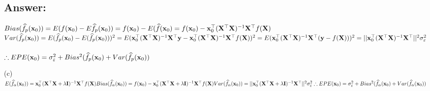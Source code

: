 \documentclass[a4 paper]{article}
\renewcommand{\epsilon}{\varepsilon}
\newcounter{problem}[section]
\newenvironment{solution}{\newpage\setcounter{problem}{0}\begin{framed}\section*{Answer:}}{\vspace{15pt}\end{framed}}
\begin{document}
\begin{solution}
$Bias(\widehat{f_p}(\mathbf x_0)) = E(f(\mathbf x_0)-E\widehat f_p(\mathbf x_0))\\=f(\mathbf x_0)-E(\widehat f(\mathbf x_0)\\=f(\mathbf x_0)-\mathbf x_0^\top(\mathbf X^\top\mathbf X)^{-1}\mathbf X^\top f(\mathbf X)$\\

$Var(\widehat{f_p}(\mathbf x_0)) =E(\widehat f_p(\mathbf x_0)-E(\widehat f_p(\mathbf x_0)))^2 \\=E(\mathbf x_0^\top(\mathbf X^\top\mathbf X)^{-1}\mathbf X^\top\mathbf y-\mathbf x_0^\top(\mathbf X^\top\mathbf X)^{-1}\mathbf X^\top f(\mathbf X))^2\\=E(\mathbf x_0^\top(\mathbf X^\top\mathbf X)^{-1}\mathbf X^\top (\mathbf y-f(\mathbf X)))^2\\=||\mathbf x_0^\top(\mathbf X^\top\mathbf X)^{-1}\mathbf X^\top ||^2\sigma_\epsilon^2$\\\\$\therefore EPE(\mathbf x_0) = \sigma_\epsilon^2+Bias^2(\widehat f_p(\mathbf x_0)+Var(\widehat f_p(\mathbf x_0))\\$


		(c)$\\E(\widehat f_\alpha(\mathbf x_0)) = \mathbf x_0^\top(\mathbf X^\top\mathbf X+\lambda\mathbf I)^{-1}\mathbf X^\top f(\mathbf X)\\Bias(\widehat f_\alpha(\mathbf x_0)) = f(\mathbf x_0)-\mathbf x_0^\top(\mathbf X^\top\mathbf X+\lambda\mathbf I)^{-1}\mathbf X^\top f(\mathbf X)\\Var(\widehat f_\alpha(\mathbf x_0))=||\mathbf x_0^\top(\mathbf X^\top\mathbf X+\lambda\mathbf I)^{-1}\mathbf X^\top||^2\sigma_\epsilon^2\\\therefore EPE(\mathbf x_0)=\sigma_\epsilon^2+Bias^2(\widehat f_\alpha(\mathbf x_0)+Var(\widehat f_\alpha(\mathbf x_0))$
		

\end{solution}
\end{document}
